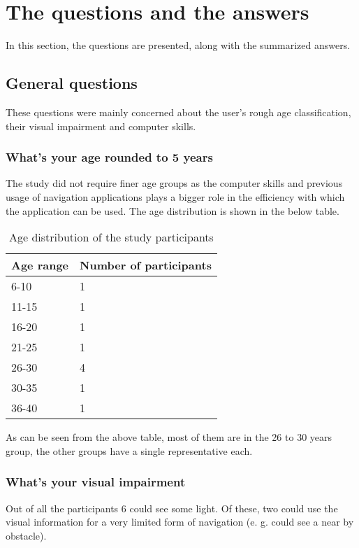 \documentclass[nolof,digital]{fithesis3}
\begin{document}
\section{The questions and the answers}
In this section, the questions are presented, along with the summarized answers.
\subsection{General questions}
These questions were mainly concerned about the user's rough age classification, their visual impairment and computer skills.
\subsubsection{What's your age rounded to 5 years}
The study did not require finer age groups as the computer skills and previous usage of navigation applications plays a bigger role in the efficiency with which the application can be used. The age distribution is shown in the below table.
\begin{table}
\caption{Age distribution of the study participants}
\begin{tabularx}{\textwidth}{ |X|X| }
Age range & Number of participants \\
\hline
6-10 & 1 \\
11-15 & 1 \\
16-20 & 1 \\
21-25  & 1 \\
26-30 & 4 \\
30-35 & 1 \\
36-40 & 1 \\
\end{tabularx}
\end{table}
As can be seen from the above table, most of them are in the 26 to 30 years group, the other groups have a single representative each.
\subsubsection{What's your visual impairment}
Out of all the participants 6 could see some light. Of these, two could use the visual information for a very limited form of navigation (e. g. could see a near by obstacle).
\end{document}
